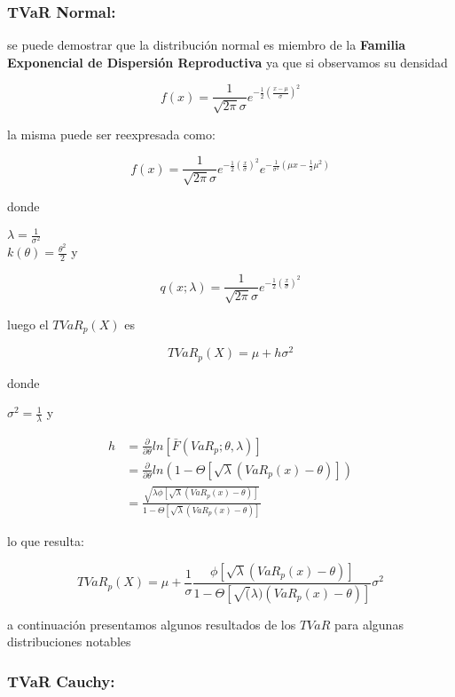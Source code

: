 \documentclass[]{article}
\begin{document}
\hypertarget{tvar-normal}{%
\subsubsection{\texorpdfstring{\textbf{TVaR
Normal:}}{TVaR Normal:}}\label{tvar-normal}}

se puede demostrar que la distribución normal es miembro de la
\textbf{Familia Exponencial de Dispersión Reproductiva} ya que si
observamos su densidad

\[f(x)=\frac{1}{\sqrt{2 \pi}\sigma} e^{-\frac{1}{2}\left(\frac{x - \mu}{\sigma}\right)^2}\]

la misma puede ser reexpresada como:

\[f(x)=\frac{1}{\sqrt{2 \pi}\sigma} e^{-\frac{1}{2}\left(\frac{x}{\sigma}\right)^2}e^{-\frac{1}{\sigma^2}\left(\mu x -\frac{1}{2} \mu ^2\right)}\]

donde

\(\lambda = \frac{1}{\sigma^2}\)\\
\(k(\theta)= \frac{\theta^2}{2}\) y

\[q(x; \lambda) = \frac{1}{\sqrt{2 \pi}\sigma}e^{-\frac{1}{2}\left(\frac{x}{\sigma}\right)^2}\]

luego el \(TVaR_p(X)\) es

\[TVaR_p(X)= \mu + h \sigma^2\]

donde

\(\sigma^2= \frac{1}{\lambda}\) y

\[\begin{array}{rl}
h &\displaystyle =\frac{\partial}{\partial \theta}ln[\bar{F}(VaR_p; \theta, \lambda)]\\
&\displaystyle =\frac{\partial}{\partial \theta}ln(1-\Theta[\sqrt{\lambda}(VaR_p(x)-\theta)])\\
&\displaystyle = \frac{\sqrt{\lambda \phi[\sqrt{\lambda}(VaR_p(x)-\theta)]}}{1-\Theta[\sqrt{\lambda}(VaR_p(x)- \theta)]}
\end{array}\]

lo que resulta:

\[TVaR_p(X) = \mu + \frac{1}{\sigma} \frac{\phi[\sqrt{\lambda}(VaR_p(x)- \theta)]}{1-\Theta[\sqrt(\lambda)(VaR_p(x)- \theta)]} \sigma^2\]

a continuación presentamos algunos resultados de los \(TVaR\) para
algunas distribuciones notables

\hypertarget{tvar-cauchy}{%
\subsubsection{\texorpdfstring{\textbf{TVaR
Cauchy:}}{TVaR Cauchy:}}\label{tvar-cauchy}}
\end{document}
